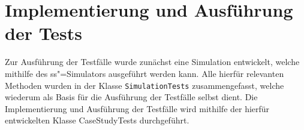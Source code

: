\chapter{Implementierung und Ausführung der Tests}
\label{chap:testExecution}

Zur Ausführung der Testfälle wurde zunächst eine Simulation entwickelt, welche mithilfe des \ac{ss}"=Simulators ausgeführt werden kann.
Alle hierfür relevanten Methoden wurden in der Klasse \texttt{SimulationTests} zusammengefasst, welche wiederum als Basis für die Ausführung der Testfälle selbst dient.
Die Implementierung und Ausführung der Testfälle wird mithilfe der hierfür entwickelten Klasse \ac{CaseStudyTests} durchgeführt.








